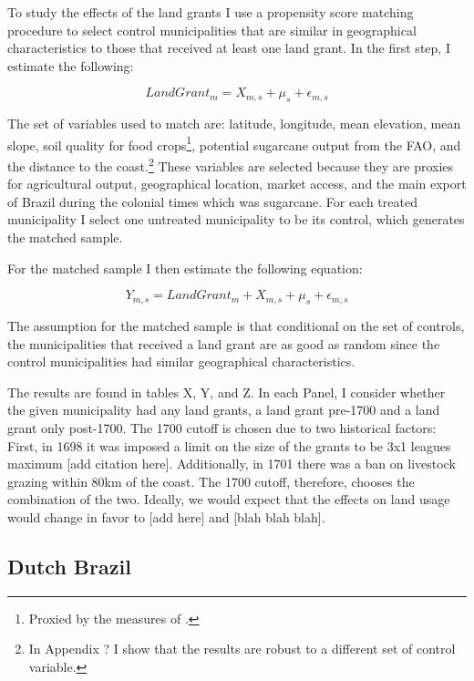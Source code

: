 \documentclass{article}
\begin{document}
To study the effects of the land grants I use a propensity score matching procedure to select control municipalities that are similar in geographical characteristics to those that received at least one land grant. In the first step, I estimate the following:

\begin{equation}
  LandGrant_m = X_{m,s} + \mu_s + \epsilon_{m,s}
\end{equation}

The set of variables used to match are: latitude, longitude, mean elevation, mean slope, soil quality for food crops\footnote{Proxied by the measures of \textcite{Galor2016-ba}.}, potential sugarcane output from the FAO, and the distance to the coast.\footnote{In Appendix ? I show that the results are robust to a different set of control variable.} These variables are selected because they are proxies for agricultural output, geographical location, market access, and the main export of Brazil during the colonial times which was sugarcane. For each treated municipality I select one untreated municipality to be its control, which generates the matched sample.

For the matched sample I then estimate the following equation:

\begin{equation}
  Y_{m,s} = LandGrant_m + X_{m,s} + \mu_s + \epsilon_{m,s}
\end{equation}

The assumption for the matched sample is that conditional on the set of controls, the municipalities that received a land grant are as good as random since the control municipalities had similar geographical characteristics. 

The results are found in tables X, Y, and Z. In each Panel, I consider whether the given municipality had any land grants, a land grant pre-1700 and a land grant only post-1700. The 1700 cutoff is chosen due to two historical factors: First, in 1698 it was imposed a limit on the size of the grants to be 3x1 leagues maximum [add citation here]. Additionally, in 1701 there was a ban on livestock grazing within 80km of the coast. The 1700 cutoff, therefore, chooses the combination of the two. Ideally, we would expect that the effects on land usage would change in favor to [add here] and [blah blah blah].

\subsection{Dutch Brazil}
\end{document}
